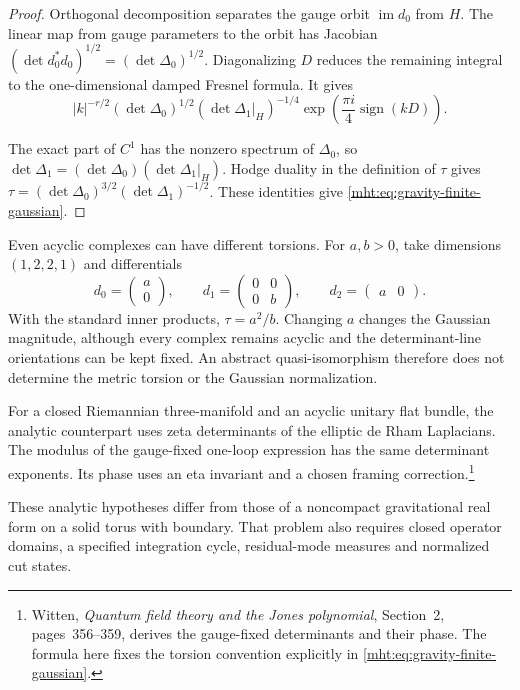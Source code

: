 \begin{proof}
Orthogonal decomposition separates the gauge orbit
$\operatorname{im}d_0$ from $H$.
The linear map from gauge parameters to the orbit has Jacobian
$(\det d_0^*d_0)^{1/2}=(\det\Delta_0)^{1/2}$.
Diagonalizing $D$ reduces the remaining integral to the
one-dimensional damped Fresnel formula.
It gives
\[
 |k|^{-r/2}(\det\Delta_0)^{1/2}
        (\det\Delta_1|_H)^{-1/4}
 \exp\left(\frac{\pi i}{4}\operatorname{sign}(kD)\right).
\]

The exact part of $C^1$ has the nonzero spectrum of $\Delta_0$,
so $\det\Delta_1=(\det\Delta_0)(\det\Delta_1|_H)$.
Hodge duality in the definition of $\tau$ gives
$\tau=(\det\Delta_0)^{3/2}(\det\Delta_1)^{-1/2}$.
These identities give \eqref{mht:eq:gravity-finite-gaussian}.
\end{proof}

Even acyclic complexes can have different torsions.
For $a,b>0$, take dimensions $(1,2,2,1)$ and differentials
\[
 d_0=\begin{pmatrix}a\\0\end{pmatrix},\qquad
 d_1=\begin{pmatrix}0&0\\0&b\end{pmatrix},\qquad
 d_2=\begin{pmatrix}a&0\end{pmatrix}.
\]
With the standard inner products, $\tau=a^2/b$.
Changing $a$ changes the Gaussian magnitude, although every
complex remains acyclic and the determinant-line orientations
can be kept fixed.
An abstract quasi-isomorphism therefore does not determine the
metric torsion or the Gaussian normalization.

For a closed Riemannian three-manifold and an acyclic unitary flat
bundle, the analytic counterpart uses zeta determinants of the
elliptic de Rham Laplacians.
The modulus of the gauge-fixed one-loop expression has the same
determinant exponents. Its phase uses an eta invariant and a
chosen framing correction.\footnote{Witten,
\emph{Quantum field theory and the Jones polynomial},
Section~2, pages~356--359, derives the gauge-fixed determinants
and their phase. The formula here fixes the torsion convention
explicitly in \eqref{mht:eq:gravity-finite-gaussian}.}

These analytic hypotheses differ from those of a noncompact
gravitational real form on a solid torus with boundary.
That problem also requires closed operator domains, a specified
integration cycle, residual-mode measures and normalized cut states.

